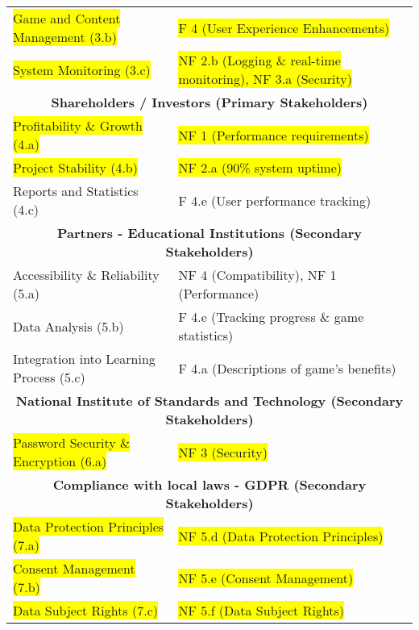 \documentclass[11pt,a4paper]{article}
\begin{document}
\begin{table}[H]
\begin{tabular}{|l|l|}
\colorbox{yellow}{Game and Content Management (3.b)}            & \colorbox{yellow}{F 4 (User Experience Enhancements)  }         \\
\colorbox{yellow}{System Monitoring (3.c)}   & \colorbox{yellow}{NF 2.b (Logging \& real-time monitoring), NF 3.a (Security)} \\
\hline
\multicolumn{2}{|c|}{\textbf{Shareholders / Investors (Primary Stakeholders)}}                         \\
\hline
\colorbox{yellow}{Profitability \& Growth (4.a) }               & \colorbox{yellow}{NF 1 (Performance requirements)  }            \\
\colorbox{yellow}{Project Stability (4.b) }                     & \colorbox{yellow}{NF 2.a (90\% system uptime)}                  \\
Reports and Statistics (4.c)                 & F 4.e (User performance tracking)            \\
\hline
\multicolumn{2}{|c|}{\textbf{Partners - Educational Institutions (Secondary Stakeholders)}}            \\
\hline
Accessibility \& Reliability (5.a)           & NF 4 (Compatibility), NF 1 (Performance)     \\
Data Analysis (5.b)                          & F 4.e (Tracking progress \& game statistics) \\
Integration into Learning Process (5.c)      & F 4.a (Descriptions of game's benefits)      \\
\hline
\multicolumn{2}{|c|}{\textbf{National Institute of Standards and Technology (Secondary Stakeholders)}} \\
\hline
\colorbox{yellow}{Password Security \& Encryption (6.a)}        & \colorbox{yellow}{NF 3 (Security)  }                            \\
\hline
\multicolumn{2}{|c|}{\textbf{Compliance with local laws - GDPR (Secondary Stakeholders)}}              \\
\hline
\colorbox{yellow}{Data Protection Principles (7.a) }             &\colorbox{yellow}{ NF 5.d (Data Protection Principles) }         \\
\colorbox{yellow}{Consent Management (7.b)   }                  & \colorbox{yellow}{NF 5.e (Consent Management)  }                \\
\colorbox{yellow}{Data Subject Rights (7.c)  }                  & \colorbox{yellow}{NF 5.f (Data Subject Rights) }                \\
\hline
\end{tabular}


\end{table}
\end{document}
